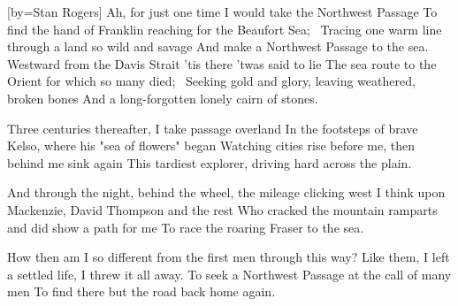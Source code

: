 [by={Stan Rogers}]
\beginchorus \singlespacing
Ah, for just one time I would take the Northwest Passage
To find the hand of Franklin reaching for the Beaufort Sea; 
Tracing one warm line through a land so wild and savage
And make a Northwest Passage to the sea.
\endchorus
\beginverse \singlespacing
Westward from the Davis Strait 'tis there 'twas said to lie
The sea route to the Orient for which so many died; 
Seeking gold and glory, leaving weathered, broken bones
And a long-forgotten lonely cairn of stones.
\endverse
{}

\beginverse \singlespacing
Three centuries thereafter, I take passage overland
In the footsteps of brave Kelso, where his "sea of flowers" began
Watching cities rise before me, then behind me sink again
This tardiest explorer, driving hard across the plain.
\endverse
{}

\beginverse \singlespacing
And through the night, behind the wheel, the mileage clicking west
I think upon Mackenzie, David Thompson and the rest
Who cracked the mountain ramparts and did show a path for me
To race the roaring Fraser to the sea.
\endverse
{}

\beginverse \singlespacing
How then am I so different from the first men through this way?
Like them, I left a settled life, I threw it all away.
To seek a Northwest Passage at the call of many men
To find there but the road back home again.
\endverse
{}
\endsong
